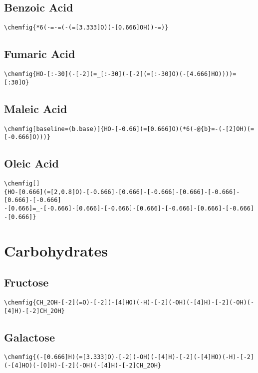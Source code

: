 \section{Benzoic Acid}\label{app:benzoic-acid}
\begin{lstlisting}
\chemfig{*6(-=-=(-(=[3.333]O)(-[0.666]OH))-=)}
\end{lstlisting}


\section{Fumaric Acid}\label{app:fumaric-acid}
\begin{lstlisting}
\chemfig{HO-[:-30](-[-2](=_[:-30](-[-2](=[:-30]O)(-[4.666]HO))))=[:30]O}
\end{lstlisting}


\section{Maleic Acid}\label{app:maleic-acid}
\begin{lstlisting}
\chemfig[baseline=(b.base)]{HO-[-0.66](=[0.666]O)(*6(-@{b}=-(-[2]OH)(=[-0.666]O)))}
\end{lstlisting}


\section{Oleic Acid}\label{app:oleic-acid}
\begin{lstlisting}
\chemfig[]
{HO-[0.666](=[2,0.8]O)-[-0.666]-[0.666]-[-0.666]-[0.666]-[-0.666]-[0.666]-[-0.666]
-[0.666]=_-[-0.666]-[0.666]-[-0.666]-[0.666]-[-0.666]-[0.666]-[-0.666]
-[0.666]}
\end{lstlisting}



\chapter{Carbohydrates}\label{app:carbohydrates}
\section{Fructose}\label{app:fructose}
\begin{lstlisting}
\chemfig{CH_2OH-[-2](=O)-[-2](-[4]HO)(-H)-[-2](-OH)(-[4]H)-[-2](-OH)(-[4]H)-[-2]CH_2OH}
\end{lstlisting}

\section{Galactose}\label{app:galactose}
\begin{lstlisting}
\chemfig{(-[0.666]H)(=[3.333]O)-[-2](-OH)(-[4]H)-[-2](-[4]HO)(-H)-[-2](-[4]HO)(-[0]H)-[-2](-OH)(-[4]H)-[-2]CH_2OH}
\end{lstlisting}

